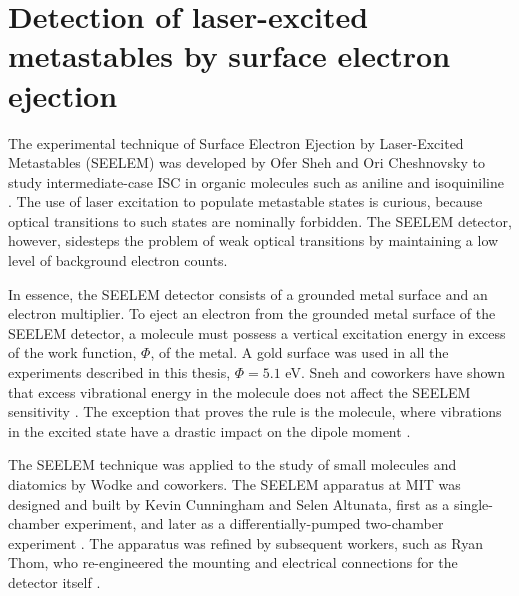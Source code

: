\documentclass[12pt]{mitthesis}
\begin{document}
\section{Detection of laser-excited metastables by surface electron
  ejection}

The experimental technique of Surface Electron Ejection by
Laser-Excited Metastables (SEELEM) was developed by Ofer Sheh and Ori
Cheshnovsky to study intermediate-case ISC in organic molecules such
as aniline and isoquiniline \cite{sneh86, sneh88, sneh89a, sneh89b,
  sneh91}.  The use of laser excitation to populate metastable states
is curious, because optical transitions to such states are nominally
forbidden.  The SEELEM detector, however, sidesteps the problem of
weak optical transitions by maintaining a low level of background
electron counts.

In essence, the SEELEM detector consists of a grounded metal surface
and an electron multiplier.  To eject an electron from the grounded
metal surface of the SEELEM detector, a molecule must possess a
vertical excitation energy in excess of the work function, $\Phi$, of
the metal.  A gold surface was used in all the experiments described
in this thesis, $\Phi = 5.1$ eV.  Sneh and coworkers have shown that
excess vibrational energy in the molecule does not affect the SEELEM
sensitivity \cite{sneh86}.  The exception that proves the rule is the
 molecule, where vibrations in the excited state have a drastic
impact on the dipole moment \cite{white05}.

The SEELEM technique was applied to the study of small molecules and
diatomics by Wodke and coworkers.  The SEELEM apparatus at MIT was
designed and built by Kevin Cunningham and Selen Altunata, first as a
single-chamber experiment, and later as a differentially-pumped
two-chamber experiment \cite{cunningham-thesis, altunata-thesis}.  The
apparatus was refined by subsequent workers, such as Ryan Thom, who
re-engineered the mounting and electrical connections for the detector
itself \cite{thom-thesis}.
\end{document}
